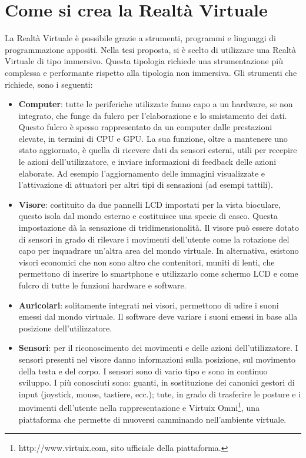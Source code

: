 \section{Come si crea la Realtà Virtuale}
La Realtà Virtuale è possibile grazie a strumenti, programmi e linguaggi di programmazione appositi. Nella tesi proposta, si è scelto di utilizzare una Realtà Virtuale di tipo immersivo. Questa tipologia richiede una strumentazione più complessa e performante rispetto alla tipologia non immersiva. Gli strumenti che richiede, sono i seguenti:
\begin{itemize}
  \item \textbf{Computer}: tutte le periferiche utilizzate fanno capo a un hardware, se non integrato, che funge da fulcro per l’elaborazione e lo smistamento dei dati. Questo fulcro è spesso rappresentato da un computer dalle prestazioni elevate, in termini di CPU e GPU. La sua funzione, oltre a mantenere uno stato aggiornato, è quella di ricevere dati da sensori esterni, utili per recepire le azioni dell’utilizzatore, e inviare informazioni di feedback delle azioni elaborate. Ad esempio l’aggiornamento delle immagini visualizzate e l’attivazione di attuatori per altri tipi di sensazioni (ad esempi tattili).
	\item\textbf{Visore}: costituito da due pannelli LCD impostati per la vista bioculare, questo isola dal mondo esterno e costituisce una specie di casco. Questa impostazione dà la sensazione di tridimensionalità. Il visore può essere dotato di sensori in grado di rilevare i movimenti dell’utente come la rotazione del capo per inquadrare un’altra area del mondo virtuale. In alternativa, esistono visori economici che non sono altro che contenitori, muniti di lenti, che permettono di inserire lo smartphone e utilizzarlo come schermo LCD e come fulcro di tutte le funzioni hardware e software.
  \item \textbf{Auricolari}: solitamente integrati nei visori, permettono di udire i suoni emessi dal mondo virtuale. Il software deve variare i suoni emessi in base alla posizione dell'utilizzatore.
  \item \textbf{Sensori}: per il riconoscimento dei movimenti e delle azioni dell'utilizzatore. I sensori presenti nel visore danno informazioni sulla posizione, sul movimento della testa e del corpo. I sensori sono di vario tipo e sono in continuo sviluppo. I più conosciuti sono: guanti, in sostituzione dei canonici gestori di input (joystick, mouse, tastiere, ecc.); tute, in grado di trasferire le posture e i movimenti dell’utente nella rappresentazione e Virtuix Omni\footnote{http://www.virtuix.com, sito ufficiale della piattaforma.}, una piattaforma che permette di muoversi camminando nell’ambiente virtuale.
\end{itemize}